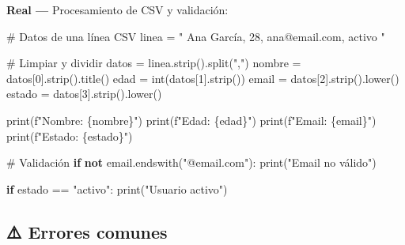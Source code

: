 \documentclass[
  doc,
  floatsintext,
  longtable,
  a4paper,
  nolmodern,
  notxfonts,
  notimes,
  12pt,
  colorlinks=true,linkcolor=blue,citecolor=blue,urlcolor=blue]{apa7}
\newenvironment{Shaded}{\begin{snugshade}}{\end{snugshade}}
\newcommand{\BuiltInTok}[1]{\textcolor[rgb]{0.00,0.23,0.31}{#1}}
\newcommand{\CommentTok}[1]{\textcolor[rgb]{0.37,0.37,0.37}{#1}}
\newcommand{\ControlFlowTok}[1]{\textcolor[rgb]{0.00,0.23,0.31}{\textbf{#1}}}
\newcommand{\DecValTok}[1]{\textcolor[rgb]{0.68,0.00,0.00}{#1}}
\newcommand{\KeywordTok}[1]{\textcolor[rgb]{0.00,0.23,0.31}{\textbf{#1}}}
\newcommand{\NormalTok}[1]{\textcolor[rgb]{0.00,0.23,0.31}{#1}}
\newcommand{\OperatorTok}[1]{\textcolor[rgb]{0.37,0.37,0.37}{#1}}
\newcommand{\SpecialCharTok}[1]{\textcolor[rgb]{0.37,0.37,0.37}{#1}}
\newcommand{\SpecialStringTok}[1]{\textcolor[rgb]{0.13,0.47,0.30}{#1}}
\newcommand{\StringTok}[1]{\textcolor[rgb]{0.13,0.47,0.30}{#1}}
\begin{document}
\textbf{Real ---} Procesamiento de CSV y validación:

\begin{Shaded}
\begin{Highlighting}[]
\CommentTok{\# Datos de una línea CSV}
\NormalTok{linea }\OperatorTok{=} \StringTok{"  Ana García, 28, ana@email.com, activo  "}

\CommentTok{\# Limpiar y dividir}
\NormalTok{datos }\OperatorTok{=}\NormalTok{ linea.strip().split(}\StringTok{","}\NormalTok{)}
\NormalTok{nombre }\OperatorTok{=}\NormalTok{ datos[}\DecValTok{0}\NormalTok{].strip().title()}
\NormalTok{edad }\OperatorTok{=} \BuiltInTok{int}\NormalTok{(datos[}\DecValTok{1}\NormalTok{].strip())}
\NormalTok{email }\OperatorTok{=}\NormalTok{ datos[}\DecValTok{2}\NormalTok{].strip().lower()}
\NormalTok{estado }\OperatorTok{=}\NormalTok{ datos[}\DecValTok{3}\NormalTok{].strip().lower()}

\BuiltInTok{print}\NormalTok{(}\SpecialStringTok{f"Nombre: }\SpecialCharTok{\{}\NormalTok{nombre}\SpecialCharTok{\}}\SpecialStringTok{"}\NormalTok{)}
\BuiltInTok{print}\NormalTok{(}\SpecialStringTok{f"Edad: }\SpecialCharTok{\{}\NormalTok{edad}\SpecialCharTok{\}}\SpecialStringTok{"}\NormalTok{)}
\BuiltInTok{print}\NormalTok{(}\SpecialStringTok{f"Email: }\SpecialCharTok{\{}\NormalTok{email}\SpecialCharTok{\}}\SpecialStringTok{"}\NormalTok{)}
\BuiltInTok{print}\NormalTok{(}\SpecialStringTok{f"Estado: }\SpecialCharTok{\{}\NormalTok{estado}\SpecialCharTok{\}}\SpecialStringTok{"}\NormalTok{)}

\CommentTok{\# Validación}
\ControlFlowTok{if} \KeywordTok{not}\NormalTok{ email.endswith(}\StringTok{"@email.com"}\NormalTok{):}
    \BuiltInTok{print}\NormalTok{(}\StringTok{"Email no válido"}\NormalTok{)}

\ControlFlowTok{if}\NormalTok{ estado }\OperatorTok{==} \StringTok{"activo"}\NormalTok{:}
    \BuiltInTok{print}\NormalTok{(}\StringTok{"Usuario activo"}\NormalTok{)}
\end{Highlighting}
\end{Shaded}

\subsection{⚠️ Errores comunes}\label{errores-comunes}
\end{document}
